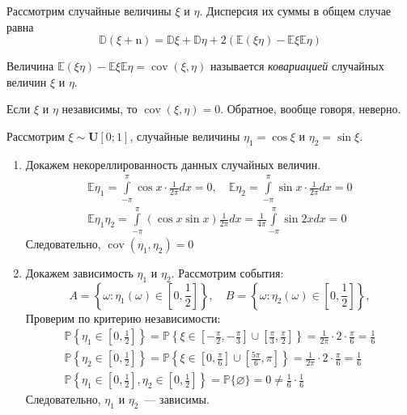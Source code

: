Рассмотрим случайные величины $\xi$ и $\eta$. Дисперсия их суммы в общем случае равна
\begin{equation*}
    \mathbb{D}(\xi+\mathrm{n})=\mathbb{D} \xi+\mathbb{D} \eta+2(\mathbb{E}(\xi \eta)-\mathbb{E} \xi \mathbb{E} \eta)
\end{equation*}
\begin{defn}
    Величина $\mathbb{E}(\xi \eta)-\mathbb{E} \xi \mathbb{E} \eta = \operatorname{cov}(\xi, \eta)$ называется {\it ковариацией} случайных величин $\xi$ и $\eta$.
\end{defn}
Если $\xi$ и $\eta$ независимы, то $\operatorname{cov}(\xi, \eta) = 0$. Обратное, вообще говоря, неверно.
\begin{exmp}
    Рассмотрим $\xi \sim \mathbf{U}[0;1]$, случайные величины $\eta_{1}=\cos \xi$ и $\eta_{2}=\sin \xi$.
    \begin{enumerate}
        \item Докажем некореллированность данных случайных величин.
        \begin{gather*}
            \mathbb{E} \eta_{1}=\int\limits_{-\pi}^{\pi} \cos x \cdot \frac{1}{2 \pi} d x=0, \quad \mathbb{E} \eta_{2}=\int\limits_{-\pi}^{\pi} \sin x \cdot \frac{1}{2 \pi} d x=0 \\
            \mathbb{E} \eta_{1} \eta_{2}=\int\limits_{-\pi}^{\pi}(\cos x \sin x) \frac{1}{2 \pi} d x=\frac{1}{4 \pi} \int\limits_{-\pi}^{\pi} \sin 2 x d x=0
        \end{gather*}
        Следовательно, $\operatorname{cov}(\eta_1, \eta_2) = 0$
        \item Докажем зависимость $\eta_1$ и $\eta_2$. Рассмотрим события:
        \begin{equation*}
            A = \left\{\omega \colon \eta_1(\omega) \in \left[0, \frac{1}{2} \right] \right\}, \quad
            B = \left\{\omega \colon \eta_2(\omega) \in \left[0, \frac{1}{2} \right] \right\},
        \end{equation*}
        Проверим по критерию независимости:
        \begin{gather*}
            \mathbb{P}\left\{\eta_{1} \in\left[0, \frac{1}{2}\right]\right\}=\mathbb{P}\left\{\xi \in\left[-\frac{\pi}{2},-\frac{\pi}{3}\right] \cup\left[\frac{\pi}{3}, \frac{\pi}{2}\right]\right\}=\frac{1}{2 \pi} \cdot 2 \cdot \frac{\pi}{6}=\frac{1}{6} \\
            \mathbb{P}\left\{\eta_{2} \in\left[0, \frac{1}{2}\right]\right\}=\mathbb{P}\left\{\xi \in\left[0, \frac{\pi}{6}\right] \cup\left[\frac{5 \pi}{6}, \pi\right]\right\}=\frac{1}{2 \pi} \cdot 2 \cdot \frac{\pi}{6}=\frac{1}{6} \\
            \mathbb{P}\left\{\eta_{1} \in\left[0, \frac{1}{2}\right], \eta_{2} \in\left[0, \frac{1}{2}\right]\right\}=\mathbb{P}\{\varnothing\}=0 \neq \frac{1}{6} \cdot \frac{1}{6}
        \end{gather*}
        Следовательно, $\eta_1$ и $\eta_2$~--- зависимы.
    \end{enumerate}
\end{exmp}

